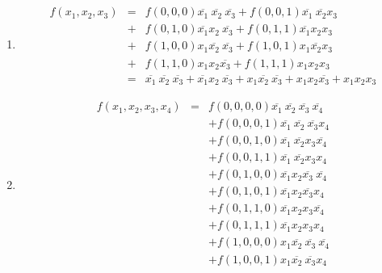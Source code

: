 \documentclass[DIN, pagenumber=false, fontsize=11pt, parskip=half]{scrartcl}
\begin{document}
    \subsection{}
    \begin{enumerate}[label=(\alph*)]
        \item 
            \begin{eqnarray*}
                f(x_1, x_2, x_3) &=& f(0, 0, 0) \overline{x_1} \ \overline{x_2} \ \overline{x_3} + f(0, 0, 1) \overline{x_1} \ \overline{x_2} x_3 \\ 
                &+& f(0, 1, 0) \overline{x_1} x_2 \ \overline{x_3} + f(0, 1, 1) \overline{x_1} x_2 x_3\\
                &+& f(1, 0, 0) x_1 \overline{x_2} \  \overline{x_3} + f(1, 0, 1) x_1 \overline{x_2} x_3\\
                &+& f(1, 1, 0) x_1 x_2 \overline{x_3} + f(1, 1, 1) x_1 x_2 x_3\\
                &=& \overline{x_1} \ \overline{x_2} \ \overline{x_3} + \overline{x_1} x_2 \ \overline{x_3} + x_1 \overline{x_2} \  \overline{x_3} + x_1 x_2 \overline{x_3} + x_1 x_2 x_3
            \end{eqnarray*}
        \item 
            \begin{eqnarray*}
                f(x_1, x_2, x_3, x_4) &=& f(0, 0, 0, 0) \overline{x_1} \ \overline{x_2} \ \overline{x_3} \ \overline{x_4} \\
                &&+ f(0, 0, 0, 1) \overline{x_1} \ \overline{x_2} \ \overline{x_3} x_4\\
                &&+ f(0, 0, 1, 0) \overline{x_1} \ \overline{x_2} x_3 \overline{x_4}\\
                &&+ f(0, 0, 1, 1) \overline{x_1} \ \overline{x_2} x_3 x_4\\
                &&+ f(0, 1, 0, 0) \overline{x_1} x_2 \overline{x_3} \ \overline{x_4}\\
                &&+ f(0, 1, 0, 1) \overline{x_1} x_2 \overline{x_3} x_4\\
                &&+ f(0, 1, 1, 0) \overline{x_1} x_2 x_3 \overline{x_4}\\
                &&+ f(0, 1, 1, 1) \overline{x_1} x_2 x_3 x_4\\
                &&+ f(1, 0, 0, 0) x_1 \overline{x_2} \ \overline{x_3} \ \overline{x_4}\\
                &&+ f(1, 0, 0, 1) x_1 \overline{x_2} \ \overline{x_3} x_4\\

\end{eqnarray*}
\end{enumerate}
\end{document}
